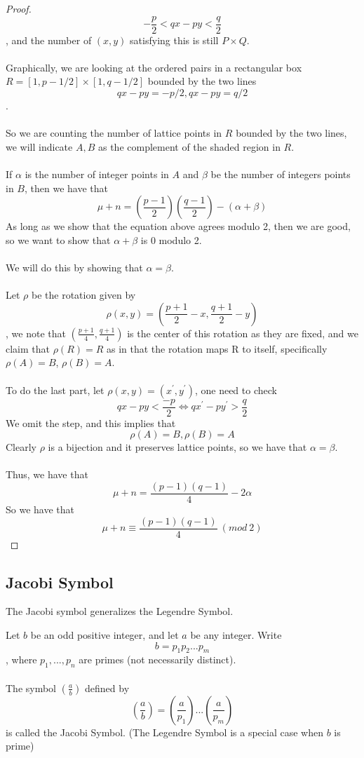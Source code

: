 \begin{proof}
\[-\frac{p}{2} < qx - py < \frac{q}{2}\]
, and the number of $(x, y)$ satisfying this is still $P \times Q$.\\\\
Graphically, we are looking at the ordered pairs in a rectangular box $R = [1, p-1/2] \times [1, q-1/2]$ bounded by the two lines
\[qx - py = -p/2, qx - py = q/2\].\\\\
So we are counting the number of lattice points in $R$ bounded by the two lines, we will indicate $A, B$ as the complement of the shaded region in $R$.\\\\
If $\alpha$ is the number of integer points in $A$ and $\beta$ be the number of integers points in $B$, then we have that
\[\mu + n = (\frac{p-1}{2})(\frac{q-1}{2}) - (\alpha + \beta)\]
As long as we show that the equation above agrees modulo 2, then we are good, so we want to show that $\alpha + \beta$ is 0 modulo 2.\\\\
We will do this by showing that $\alpha = \beta$.\\\\
Let $\rho$ be the rotation given by
\[\rho(x, y) = (\frac{p+1}{2} - x, \frac{q+1}{2} - y)\]
, we note that $(\frac{p+1}{4}, \frac{q+1}{4})$ is the center of this rotation as they are fixed, and we claim that $\rho(R) = R$ as in that the rotation maps R to itself, specifically $\rho(A) = B$, $\rho(B) = A$.\\\\
To do the last part, let $\rho(x, y) = (x^\prime, y^\prime)$, one need to check 
\[qx - py < \frac{-p}{2} \iff qx^\prime - py^\prime > \frac{q}{2}\]
We omit the step, and this implies that
\[\rho(A) = B, \rho(B) = A\]
Clearly $\rho$ is a bijection and it preserves lattice points, so we have that $\alpha = \beta$.\\\\
Thus, we have that
\[\mu + n = \frac{(p-1)(q-1)}{4} - 2\alpha\]
So we have that
\[\mu + n \equiv \frac{(p-1)(q-1)}{4}\ (mod\ 2)\]
\end{proof}

\subsection{Jacobi Symbol}

The Jacobi symbol generalizes the Legendre Symbol.

\begin{definition}
Let $b$ be an odd positive integer, and let $a$ be any integer. Write
\[b = p_1p_2...p_m\]
, where $p_1, ..., p_n$ are primes (not necessarily distinct).\\\\
The symbol $(\frac{a}{b})$ defined by
\[(\frac{a}{b}) = (\frac{a}{p_1})...(\frac{a}{p_m})\]
is called the Jacobi Symbol. (The Legendre Symbol is a special case when $b$ is prime)
\end{definition}

